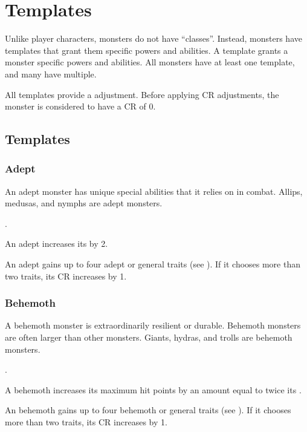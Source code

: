 \chapter{Templates}\label{Templates}

Unlike player characters, monsters do not have ``classes''.
Instead, monsters have templates that grant them specific powers and abilities.
A template grants a monster specific powers and abilities.
All monsters have at least one template, and many have multiple.

All templates provide a  adjustment.
Before applying CR adjustments, the monster is considered to have a CR of 0.

\section{Templates}

    \subsection{Adept}\label{Adept}
        An adept monster has unique special abilities that it relies on in combat.
        Allips, medusas, and nymphs are adept monsters.

         .

         An adept increases its  by 2.

         An adept gains up to four adept or general traits (see ).
        If it chooses more than two traits, its CR increases by 1.

    \subsection{Behemoth}\label{Behemoth}
        A behemoth monster is extraordinarily resilient or durable.
        Behemoth monsters are often larger than other monsters.
        Giants, hydras, and trolls are behemoth monsters.

         .

         A behemoth increases its maximum hit points by an amount equal to twice its .

         An behemoth gains up to four behemoth or general traits (see ).
        If it chooses more than two traits, its CR increases by 1.

